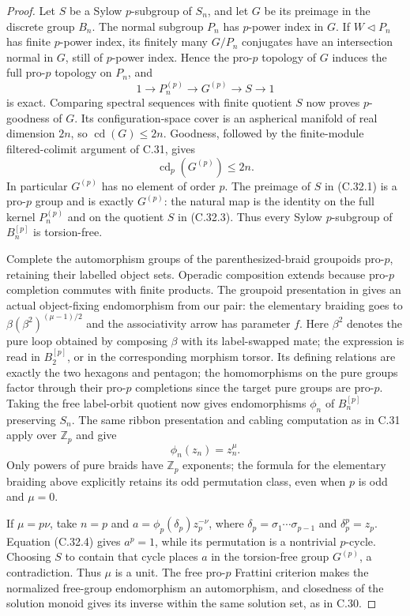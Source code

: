 \begin{proof}
Let $S$ be a Sylow $p$-subgroup of $S_n$, and let $G$ be its
preimage in the discrete group $B_n$. The normal subgroup $P_n$
has $p$-power index in $G$. If $W\triangleleft P_n$ has finite
$p$-power index, its finitely many $G/P_n$ conjugates have an
intersection normal in $G$, still of $p$-power index. Hence the
pro-$p$ topology of $G$ induces the full pro-$p$ topology on $P_n$,
and
\[
 1\longrightarrow P_n^{(p)}\longrightarrow G^{(p)}
       \longrightarrow S\longrightarrow1                       \tag{C.32.3}
\]
is exact. Comparing spectral sequences with finite quotient $S$
now proves $p$-goodness of $G$. Its configuration-space cover is
an aspherical manifold of real dimension $2n$, so
$\operatorname{cd}(G)\leq2n$. Goodness, followed by the finite-module
filtered-colimit argument of C.31, gives
\[
                    \operatorname{cd}_p(G^{(p)})\leq2n.
\]
In particular $G^{(p)}$ has no element of order $p$. The preimage
of $S$ in (C.32.1) is a pro-$p$ group and is exactly $G^{(p)}$:
the natural map is the identity on the full kernel $P_n^{(p)}$
and on the quotient $S$ in (C.32.3). Thus every Sylow $p$-subgroup
of $B_n^{[p]}$ is torsion-free.

Complete the automorphism groups of the parenthesized-braid
groupoids pro-$p$, retaining their labelled object sets. Operadic
composition extends because pro-$p$ completion commutes with finite
products. The groupoid presentation in
\cite[Lemma 7.1 and Proposition 7.3]{CEBHR2019} gives an actual
object-fixing endomorphism from our pair: the elementary braiding
goes to $\beta(\beta^2)^{(\mu-1)/2}$ and the associativity arrow
has parameter $f$. Here $\beta^2$ denotes the pure loop obtained
by composing $\beta$ with its label-swapped mate; the expression
is read in $B_2^{[p]}$, or in the corresponding morphism torsor.
Its defining relations are exactly the two
hexagons and pentagon; the homomorphisms on the pure groups factor
through their pro-$p$ completions since the target pure groups
are pro-$p$. Taking the free label-orbit quotient now gives
endomorphisms $\phi_n$ of $B_n^{[p]}$ preserving $S_n$.
The same ribbon presentation and cabling computation as in C.31
apply over $\mathbb Z_p$ and give
\[
                             \phi_n(z_n)=z_n^\mu.                \tag{C.32.4}
\]
Only powers of pure braids have $\mathbb Z_p$ exponents; the formula
for the elementary braiding above explicitly retains its odd
permutation class, even when $p$ is odd and $\mu=0$.

If $\mu=p\nu$, take $n=p$ and
$a=\phi_p(\delta_p)z_p^{-\nu}$, where
$\delta_p=\sigma_1\cdots\sigma_{p-1}$ and $\delta_p^p=z_p$.
Equation (C.32.4) gives $a^p=1$, while its permutation is a
nontrivial $p$-cycle. Choosing $S$ to contain that cycle places
$a$ in the torsion-free group $G^{(p)}$, a contradiction.
Thus $\mu$ is a unit. The free pro-$p$ Frattini criterion makes
the normalized free-group endomorphism an automorphism, and
closedness of the solution monoid gives its inverse within the
same solution set, as in C.30.
\end{proof}

